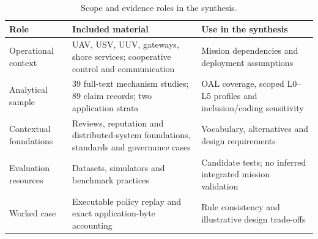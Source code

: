 \begin{table}[!htb]
\caption{Scope and evidence roles in the synthesis.\label{tab:scope}}
\begin{tabularx}{\textwidth}{@{}P{31mm}YY@{}}
\toprule
\textbf{Role} & \textbf{Included material} & \textbf{Use in the synthesis}\\
\midrule
Operational context & UAV, USV, UUV, gateways, shore services; cooperative control and communication & Mission dependencies and deployment assumptions\\
Analytical sample & 39 full-text mechanism studies; 89 claim records; two application strata & OAL coverage, scoped L0--L5 profiles and inclusion/coding sensitivity\\
Contextual foundations & Reviews, reputation and distributed-system foundations, standards and governance cases & Vocabulary, alternatives and design requirements\\
Evaluation resources & Datasets, simulators and benchmark practices & Candidate tests; no inferred integrated mission validation\\
Worked case & Executable policy replay and exact application-byte accounting & Rule consistency and illustrative design trade-offs\\
\bottomrule
\end{tabularx}
\end{table}
